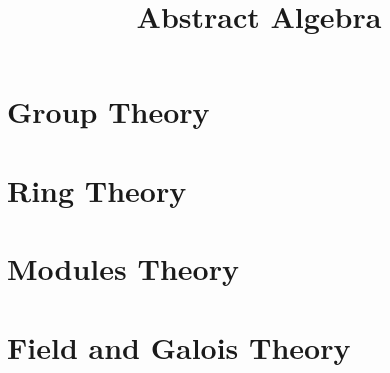 \documentclass[12pt, oneside]{book}
\begin{document}
\frontmatter
\title{{\Huge{\textbf{Abstract Algebra}}}}
\maketitle
{}
\tableofcontents %


\mainmatter
{} %



\part{Group Theory}



\part{Ring Theory}





\part{Modules Theory}





\part{Field and Galois Theory}

\end{document}
